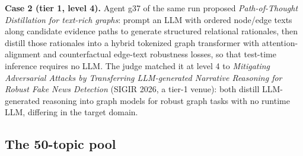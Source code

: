 \documentclass{article} %
\begin{document}
\textbf{Case 2 (tier 1, level 4).} Agent g37 of the same run proposed
\emph{Path-of-Thought Distillation for text-rich graphs}: prompt an LLM
with ordered node/edge texts along candidate evidence paths to generate
structured relational rationales, then distill those rationales into a
hybrid tokenized graph transformer with attention-alignment and
counterfactual edge-text robustness losses, so that test-time inference
requires no LLM. The judge matched it at level 4 to \emph{Mitigating
Adversarial Attacks by Transferring LLM-generated Narrative Reasoning
for Robust Fake News Detection} (SIGIR 2026, a tier-1 venue): both
distill LLM-generated reasoning into graph models for robust graph
tasks with no runtime LLM, differing in the target domain.

\subsection{The 50-topic pool}
\label{app:topiclist}
\end{document}
